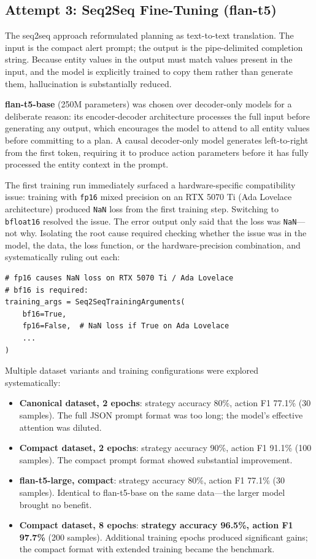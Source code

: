 \subsection{Attempt 3: Seq2Seq Fine-Tuning (flan-t5)}

The seq2seq approach reformulated planning as text-to-text translation. The input is the compact alert prompt; the output is the pipe-delimited completion string. Because entity values in the output must match values present in the input, and the model is explicitly trained to copy them rather than generate them, hallucination is substantially reduced.

\textbf{flan-t5-base} \cite{chung2022flan, vaswani2017attention} (250M parameters) was chosen over decoder-only models for a deliberate reason: its encoder-decoder architecture processes the full input before generating any output, which encourages the model to attend to all entity values before committing to a plan. A causal decoder-only model generates left-to-right from the first token, requiring it to produce action parameters before it has fully processed the entity context in the prompt.

The first training run immediately surfaced a hardware-specific compatibility issue: training with \texttt{fp16} mixed precision on an RTX 5070 Ti (Ada Lovelace architecture) produced \texttt{NaN} loss from the first training step. Switching to \texttt{bfloat16} resolved the issue. The error output only said that the loss was \texttt{NaN}---not why. Isolating the root cause required checking whether the issue was in the model, the data, the loss function, or the hardware-precision combination, and systematically ruling out each:

\begin{verbatim}
# fp16 causes NaN loss on RTX 5070 Ti / Ada Lovelace
# bf16 is required:
training_args = Seq2SeqTrainingArguments(
    bf16=True,
    fp16=False,  # NaN loss if True on Ada Lovelace
    ...
)
\end{verbatim}

Multiple dataset variants and training configurations were explored systematically:

\begin{itemize}
    \item \textbf{Canonical dataset, 2 epochs}: strategy accuracy 80\%, action F1 77.1\% (30 samples). The full JSON prompt format was too long; the model's effective attention was diluted.
    \item \textbf{Compact dataset, 2 epochs}: strategy accuracy 90\%, action F1 91.1\% (100 samples). The compact prompt format showed substantial improvement.
    \item \textbf{flan-t5-large, compact}: strategy accuracy 80\%, action F1 77.1\% (30 samples). Identical to flan-t5-base on the same data---the larger model brought no benefit.
    \item \textbf{Compact dataset, 8 epochs}: \textbf{strategy accuracy 96.5\%, action F1 97.7\%} (200 samples). Additional training epochs produced significant gains; the compact format with extended training became the benchmark.
\end{itemize}

